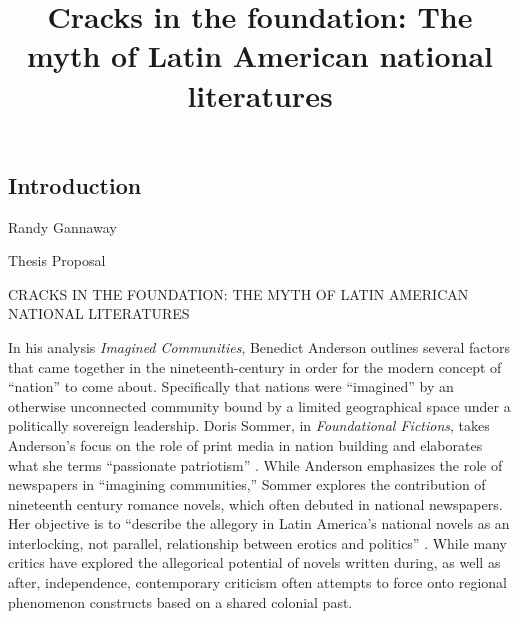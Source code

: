 \documentclass[12pt]{report}
\title{Cracks in the foundation: The myth of Latin American national literatures}
\begin{document}
\begin{singlespace}
	\chapter{Introduction}
\end{singlespace}


\noindent
Randy Gannaway

\noindent
Thesis Proposal

\begin{center}
CRACKS IN THE FOUNDATION: THE MYTH OF LATIN AMERICAN NATIONAL LITERATURES
\end{center}

In his analysis \textit{Imagined Communities}, Benedict Anderson outlines several factors that came together in the nineteenth-century in order for the modern concept of \enquote{nation} to come about. 
Specifically that nations were \enquote{imagined} by an otherwise unconnected community bound by a limited geographical space under a politically sovereign leadership\nocite{Anderson2006}. 
Doris Sommer, in \textit{Foundational Fictions}, takes Anderson's focus on the role of print media in nation building and elaborates what she terms \enquote{passionate patriotism} \autocite*[33]{Sommer1991}. 
While Anderson emphasizes the role of newspapers in \enquote{imagining communities,} Sommer explores the contribution of nineteenth century romance novels, which often debuted in national newspapers. 
Her objective is to \enquote{describe the allegory in Latin America's national novels as an interlocking, not parallel, relationship between erotics and politics} \autocite[43]{Sommer1991}. 
While many critics have explored the allegorical potential of novels written during, as well as after, independence, contemporary criticism often attempts to force onto regional phenomenon constructs based on a shared colonial past.
\end{document}
